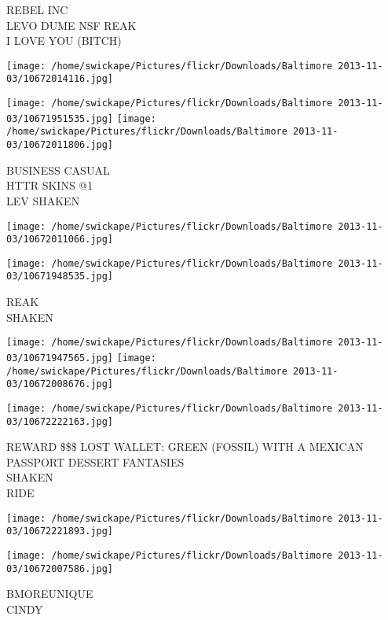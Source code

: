 \documentclass[10pt,letterpaper]{article}
\begin{document}
REBEL INC\\
LEVO DUME NSF REAK\\
I LOVE YOU (BITCH)\\
\pagebreak

\texttt{[image: /home/swickape/Pictures/flickr/Downloads/Baltimore 2013-11-03/10672014116.jpg]}

\vspace{0.25in}
\texttt{[image: /home/swickape/Pictures/flickr/Downloads/Baltimore 2013-11-03/10671951535.jpg]}
\texttt{[image: /home/swickape/Pictures/flickr/Downloads/Baltimore 2013-11-03/10672011806.jpg]}

BUSINESS CASUAL\\
HTTR SKINS @1\\
LEV SHAKEN\\
\pagebreak

\texttt{[image: /home/swickape/Pictures/flickr/Downloads/Baltimore 2013-11-03/10672011066.jpg]}

\vspace{0.25in}
\texttt{[image: /home/swickape/Pictures/flickr/Downloads/Baltimore 2013-11-03/10671948535.jpg]}

REAK\\
SHAKEN\\
\pagebreak

\texttt{[image: /home/swickape/Pictures/flickr/Downloads/Baltimore 2013-11-03/10671947565.jpg]}
\texttt{[image: /home/swickape/Pictures/flickr/Downloads/Baltimore 2013-11-03/10672008676.jpg]}

\texttt{[image: /home/swickape/Pictures/flickr/Downloads/Baltimore 2013-11-03/10672222163.jpg]}

REWARD \$\$\$ LOST WALLET: GREEN (FOSSIL) WITH A MEXICAN PASSPORT DESSERT FANTASIES\\
SHAKEN\\
RIDE\\
\pagebreak

\texttt{[image: /home/swickape/Pictures/flickr/Downloads/Baltimore 2013-11-03/10672221893.jpg]}

\vspace{0.25in}
\texttt{[image: /home/swickape/Pictures/flickr/Downloads/Baltimore 2013-11-03/10672007586.jpg]}

BMOREUNIQUE\\
CINDY\\
\pagebreak
\end{document}

